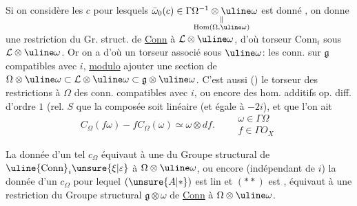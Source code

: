 Si on considère les $c$ pour lesquels
$\bar\omega_0(c)\in\underset{\substack{\Vert\\\operatorname{Hom}(\Omega,\uline\omega)}}{\Gamma\Omega^{-1}\otimes\uline\omega}$
est donné , on donne une restriction
du Gr. struct. de \uline{Conn} à $\mathcal L\otimes\uline\omega$,
d'où torseur $\mathrm{Conn}_i$ sous $\mathcal L\otimes\uline\omega$. Or on a
d'où un torseur associé sous $\uline\omega$: les conn.
sur $\mathfrak g$ compatibles avec $i$, \uline{modulo} 
ajouter une section de $\Omega\otimes\uline\omega\subset\mathcal L\otimes\uline\omega\subset\mathfrak g\otimes\uline\omega$.
C'est aussi () le torseur des restrictions
à $\Omega$ des conn. compatibles avec $i$, ou encore
des hom. additifs op. diff. d'ordre $1$ (rel. $S$
 que la composée
soit linéaire (et égale à $-2i$), et que l'on ait
\[
C_\Omega(f\omega)-fC_\Omega(\omega)\simeq\omega\otimes df.
\qquad\begin{array}{l}\omega\in\Gamma\Omega\\f\in\Gamma O_X\end{array}
\]

La donnée d'un tel  $c_\Omega$ équivaut à une
 du Groupe structural de
$\uline{\mathrm{Conn}}_i\unsure{\xi|\varepsilon}$ à $\Omega\otimes\uline\omega$, ou encore
(indépendant de $i$) la donnée d'un $c_\Omega$ pour lequel
$(\unsure{A|*})$ est lin et $(**)$ est , équivaut
à une restriction du Groupe structural
$\mathfrak g\otimes\omega$ de \uline{Conn} à $\Omega\otimes\uline\omega$.

